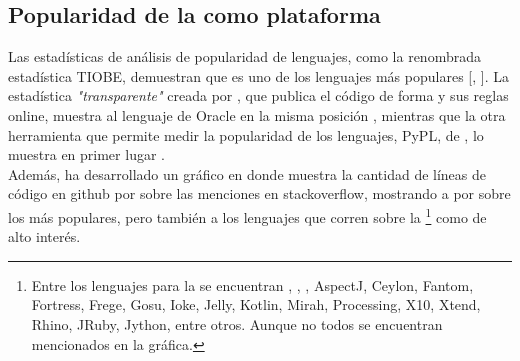 \subsection{Popularidad de la \jvm como plataforma}
\label{subsec:intro:jvm_growth}

Las estadísticas de análisis de popularidad de lenguajes, como la renombrada 
estadística TIOBE, demuestran que \java es uno de los lenguajes más populares 
[, \citeyear{TIOBE:2014:ONLINE}]. La 
estadística \emph{"transparente"} creada por 
, que publica el código de forma 
\opensource y sus reglas online, muestra al lenguaje de Oracle en la misma 
posición , mientras que la otra herramienta 
\opensource que permite medir la popularidad de los lenguajes, PyPL, de
, lo muestra en primer lugar
.\\
Además,  ha desarrollado un gráfico en donde 
muestra la cantidad de líneas de código en \gls{github} por sobre las menciones 
en \gls{stackoverflow}, mostrando a \java por sobre los más populares, pero 
también a los lenguajes que corren sobre la \jvm\footnote{
	Entre los lenguajes para la \jvm se encuentran \scala, \clojure, \groovy, 
	AspectJ, Ceylon, Fantom, Fortress, Frege, Gosu, Ioke, Jelly, Kotlin, Mirah, 
	Processing, X10, Xtend, Rhino, JRuby, Jython, entre otros. Aunque no todos 
	se encuentran mencionados en la gráfica.
} como de alto interés.\\